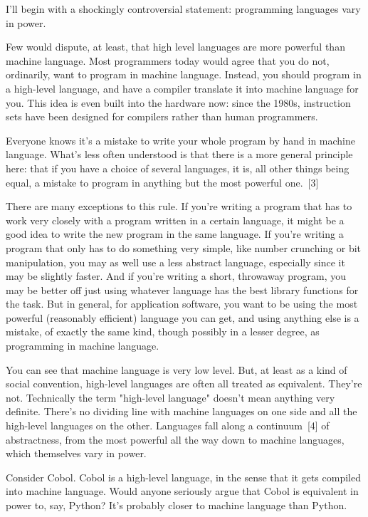 \documentclass[10pt,twoside,openright]{memoir}
\begin{document}
I'll begin with a shockingly controversial statement: programming languages vary in power.

Few would dispute, at least, that high level languages are more powerful than machine language. Most programmers today would agree that you do not, ordinarily, want to program in machine language. Instead, you should program in a high-level language, and have a compiler translate it into machine language for you. This idea is even built into the hardware now: since the 1980s, instruction sets have been designed for compilers rather than human programmers.

Everyone knows it's a mistake to write your whole program by hand in machine language. What's less often understood is that there is a more general principle here: that if you have a choice of several languages, it is, all other things being equal, a mistake to program in anything but the most powerful one.~[3]

There are many exceptions to this rule. If you're writing a program that has to work very closely with a program written in a certain language, it might be a good idea to write the new program in the same language. If you're writing a program that only has to do something very simple, like number crunching or bit manipulation, you may as well use a less abstract language, especially since it may be slightly faster. And if you're writing a short, throwaway program, you may be better off just using whatever language has the best library functions for the task. But in general, for application software, you want to be using the most powerful (reasonably efficient) language you can get, and using anything else is a mistake, of exactly the same kind, though possibly in a lesser degree, as programming in machine language.

You can see that machine language is very low level. But, at least as a kind of social convention, high-level languages are often all treated as equivalent. They're not. Technically the term "high-level language" doesn't mean anything very definite. There's no dividing line with machine languages on one side and all the high-level languages on the other. Languages fall along a continuum~[4] of abstractness, from the most powerful all the way down to machine languages, which themselves vary in power.

Consider Cobol. Cobol is a high-level language, in the sense that it gets compiled into machine language. Would anyone seriously argue that Cobol is equivalent in power to, say, Python? It's probably closer to machine language than Python.
\end{document}
